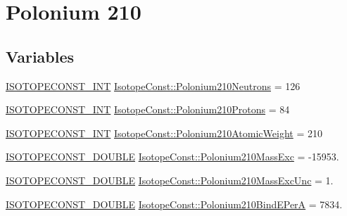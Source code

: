 \hypertarget{group___isotope_const-_polonium-_po210}{}\section{Polonium 210}
\label{group___isotope_const-_polonium-_po210}
\subsection*{Variables}
\begin{DoxyCompactItemize}
\item 
\mbox{\hyperlink{group___isotope_const-_macros_ga5f18360b3e99483a35c32d789e62621c}{I\+S\+O\+T\+O\+P\+E\+C\+O\+N\+S\+T\+\_\+\+I\+NT}} \mbox{\hyperlink{group___isotope_const-_polonium-_po210_ga8f6b187e40652ce87258bcbbdab91a07}{Isotope\+Const\+::\+Polonium210\+Neutrons}} = 126
\item 
\mbox{\hyperlink{group___isotope_const-_macros_ga5f18360b3e99483a35c32d789e62621c}{I\+S\+O\+T\+O\+P\+E\+C\+O\+N\+S\+T\+\_\+\+I\+NT}} \mbox{\hyperlink{group___isotope_const-_polonium-_po210_ga37bcd7901913e8db864b8817610ce8b0}{Isotope\+Const\+::\+Polonium210\+Protons}} = 84
\item 
\mbox{\hyperlink{group___isotope_const-_macros_ga5f18360b3e99483a35c32d789e62621c}{I\+S\+O\+T\+O\+P\+E\+C\+O\+N\+S\+T\+\_\+\+I\+NT}} \mbox{\hyperlink{group___isotope_const-_polonium-_po210_gad80f7f625d689f5053f4b3d36ccf9230}{Isotope\+Const\+::\+Polonium210\+Atomic\+Weight}} = 210
\item 
\mbox{\hyperlink{group___isotope_const-_macros_ga8f45a7272ce02c0b4c65c44636ed719a}{I\+S\+O\+T\+O\+P\+E\+C\+O\+N\+S\+T\+\_\+\+D\+O\+U\+B\+LE}} \mbox{\hyperlink{group___isotope_const-_polonium-_po210_gae6ed7b3e11d89c902eb5411966c788a6}{Isotope\+Const\+::\+Polonium210\+Mass\+Exc}} = -\/15953.
\item 
\mbox{\hyperlink{group___isotope_const-_macros_ga8f45a7272ce02c0b4c65c44636ed719a}{I\+S\+O\+T\+O\+P\+E\+C\+O\+N\+S\+T\+\_\+\+D\+O\+U\+B\+LE}} \mbox{\hyperlink{group___isotope_const-_polonium-_po210_gaea150eba1707833c0079543e5c591ce6}{Isotope\+Const\+::\+Polonium210\+Mass\+Exc\+Unc}} = 1.
\item 
\mbox{\hyperlink{group___isotope_const-_macros_ga8f45a7272ce02c0b4c65c44636ed719a}{I\+S\+O\+T\+O\+P\+E\+C\+O\+N\+S\+T\+\_\+\+D\+O\+U\+B\+LE}} \mbox{\hyperlink{group___isotope_const-_polonium-_po210_gaed8862c258174c891b0de2a52117d678}{Isotope\+Const\+::\+Polonium210\+Bind\+E\+PerA}} = 7834.
\item 

\end{DoxyCompactItemize}

